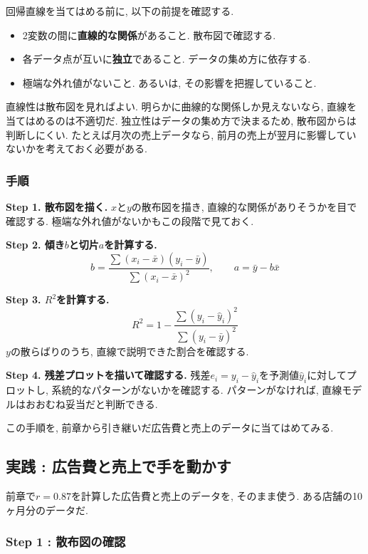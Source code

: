 回帰直線を当てはめる前に, 以下の前提を確認する.

\begin{itemize}
  \item 2変数の間に\textbf{直線的な関係}があること. 散布図で確認する.
  \item 各データ点が互いに\textbf{独立}であること. データの集め方に依存する.
  \item 極端な外れ値がないこと. あるいは, その影響を把握していること.
\end{itemize}

直線性は散布図を見ればよい.
明らかに曲線的な関係しか見えないなら, 直線を当てはめるのは不適切だ.
独立性はデータの集め方で決まるため, 散布図からは判断しにくい.
たとえば月次の売上データなら, 前月の売上が翌月に影響していないかを考えておく必要がある.

\subsubsection*{手順}

\textbf{Step 1. 散布図を描く.}
$x$と$y$の散布図を描き, 直線的な関係がありそうかを目で確認する.
極端な外れ値がないかもこの段階で見ておく.

\textbf{Step 2. 傾き$b$と切片$a$を計算する.}
\[
  b = \frac{\sum(x_i - \bar{x})(y_i - \bar{y})}{\sum(x_i - \bar{x})^2}, \qquad a = \bar{y} - b\bar{x}
\]

\textbf{Step 3. $R^2$を計算する.}
\[
  R^2 = 1 - \frac{\sum(y_i - \hat{y}_i)^2}{\sum(y_i - \bar{y})^2}
\]
$y$の散らばりのうち, 直線で説明できた割合を確認する.

\textbf{Step 4. 残差プロットを描いて確認する.}
残差$e_i = y_i - \hat{y}_i$を予測値$\hat{y}_i$に対してプロットし, 系統的なパターンがないかを確認する.
パターンがなければ, 直線モデルはおおむね妥当だと判断できる.

この手順を, 前章から引き継いだ広告費と売上のデータに当てはめてみる.


\subsection{実践 : 広告費と売上で手を動かす}

前章で$r = 0.87$を計算した広告費と売上のデータを, そのまま使う.
ある店舗の10ヶ月分のデータだ.


\subsubsection*{Step 1 : 散布図の確認}


